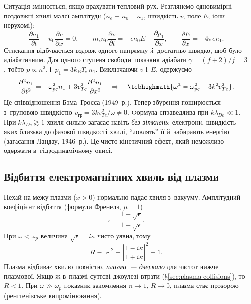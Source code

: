 Ситуація змінюється, якщо врахувати тепловий рух. Розглянемо одновимірні поздовжні хвилі
малої амплітуди ($n_e=n_0+n_1$, швидкість $v$, поле $E$; іони нерухомі):
\begin{equation*}
	\frac{\partial n_1}{\partial t}+n_0\frac{\partial v}{\partial x}=0,\qquad
	m_en_0\frac{\partial v}{\partial t}=-en_0E-\frac{\partial p_1}{\partial x},\qquad
	\frac{\partial E}{\partial x}=-4\pi en_1.
\end{equation*}
Стискання відбувається вздовж одного напрямку й~достатньо швидко, щоб було адіабатичним.
Для одного ступеня свободи показник адіабати $\gamma=(f+2)/f=3$, тобто $p\propto n^3$,
і~$p_1=3k_{\mathrm B}T_e\,n_1$. Виключаючи $v$ і~$E$, одержуємо
\begin{equation*}
	\frac{\partial^2n_1}{\partial t^2}=-\omega_{pe}^2n_1+3v_{Te}^2\frac{\partial^2n_1}{\partial x^2}
	\quad\Rightarrow\quad
	\tcbhighmath{\omega^2=\omega_{pe}^2+3k^2v_{Te}^2}.
\end{equation*}
Це співвідношення Бома--Гросса (1949~р.). Тепер збурення поширюється з~груповою швидкістю
$v_{\mathrm{гр}}=3kv_{Te}^2/\omega\neq0$. Формула справедлива при $k\lambda_{De}\ll1$. При
$k\lambda_{De}\gtrsim1$ хвиля сильно загасає навіть \emph{без зіткнень}: електрони,
швидкість яких близька до фазової швидкості хвилі, \enquote{ловлять} її й~забирають
енергію (загасання Ландау, 1946~р.). Це чисто кінетичний ефект, який неможливо одержати
в~гідродинамічному описі.



\subsection*{Відбиття електромагнітних хвиль від плазми}



Нехай на межу плазми ($x>0$) нормально падає хвиля з~вакууму. Амплітудний коефіцієнт
відбиття (формули Френеля, $\mu=1$)
\begin{equation*}
	r=\frac{1-\sqrt\epsilon}{1+\sqrt\epsilon}.
\end{equation*}
При $\omega<\omega_p$ величина $\sqrt\epsilon=i\kappa$ чисто уявна, тому
\begin{equation*}
	R=|r|^2=\left|\frac{1-i\kappa}{1+i\kappa}\right|^2=1.
\end{equation*}
Плазма відбиває хвилю повністю, \emph{плазма~--- дзеркало} для частот нижче плазмової.
Якщо ж в~плазмі суттєві джоулеві втрати (§\ref{sec:plasma-collisions}), то $R<1$. При
$\omega\gg\omega_p$ показник заломлення $n\to1$, $R\to0$, плазма стає прозорою
(рентгенівське випромінювання).

